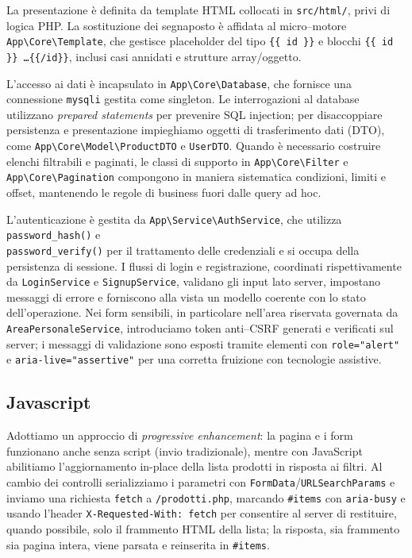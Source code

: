 La presentazione è definita da template HTML collocati in \texttt{src/html/}, privi di logica PHP. La sostituzione dei segnaposto è affidata al micro--motore \texttt{App\textbackslash Core\textbackslash Template}, che gestisce placeholder del tipo \texttt{\{\{ id \}\}} e blocchi \texttt{\{\{ id \}\} \dots \{\{/id\}\}}, inclusi casi annidati e strutture array/oggetto. 

L'accesso ai dati è incapsulato in \texttt{App\textbackslash Core\textbackslash Database}, che fornisce una connessione \texttt{mysqli} gestita come singleton. Le interrogazioni al database utilizzano \emph{prepared statements} per prevenire SQL injection; per disaccoppiare persistenza e presentazione impieghiamo oggetti di trasferimento dati (DTO), come \texttt{App\textbackslash Core\textbackslash Model\textbackslash ProductDTO} e \texttt{UserDTO}. Quando è necessario costruire elenchi filtrabili e paginati, le classi di supporto in \texttt{App\textbackslash Core\textbackslash Filter} e \texttt{App\textbackslash Core\textbackslash Pagination} compongono in maniera sistematica condizioni, limiti e offset, mantenendo le regole di business fuori dalle query ad hoc.

L'autenticazione è gestita da \texttt{App\textbackslash Service\textbackslash AuthService}, che utilizza \texttt{password\_hash()} e \\\texttt{password\_verify()} per il trattamento delle credenziali e si occupa della persistenza di sessione. I flussi di login e registrazione, coordinati rispettivamente da \texttt{LoginService} e \texttt{SignupService}, validano gli input lato server, impostano messaggi di errore e forniscono alla vista un modello coerente con lo stato dell'operazione. Nei form sensibili, in particolare nell'area riservata governata da \texttt{AreaPersonaleService}, introduciamo token anti--CSRF generati e verificati sul server; i messaggi di validazione sono esposti tramite elementi con \texttt{role="alert"} e \texttt{aria-live="assertive"} per una corretta fruizione con tecnologie assistive.

\subsection{Javascript}

Adottiamo un approccio di \emph{progressive enhancement}: la pagina e i form funzionano anche senza script (invio tradizionale), mentre con JavaScript abilitiamo l’aggiornamento in-place della lista prodotti in risposta ai filtri. Al cambio dei controlli serializziamo i parametri con \texttt{FormData}/\texttt{URLSearchParams} e inviamo una richiesta \texttt{fetch} a \texttt{/prodotti.php}, marcando \texttt{\#items} con \texttt{aria-busy} e usando l’header \texttt{X-Requested-With: fetch} per consentire al server di restituire, quando possibile, solo il frammento HTML della lista; la risposta, sia frammento sia pagina intera, viene parsata e reinserita in \texttt{\#items}. 

